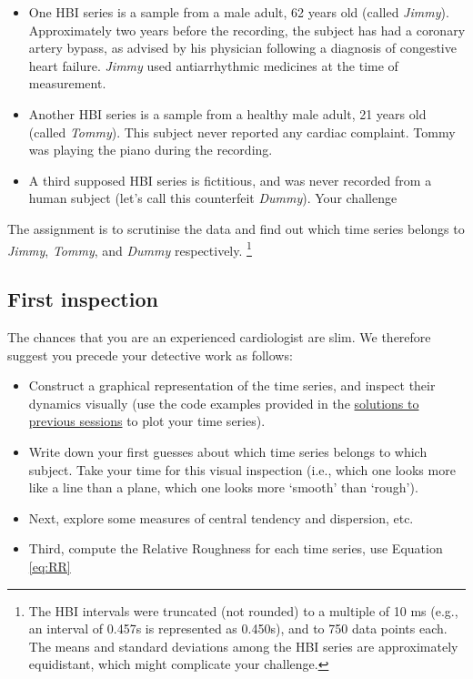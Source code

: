 \documentclass[]{book}
\providecommand{\tightlist}{%
  \setlength{\itemsep}{0pt}\setlength{\parskip}{0pt}}
\let\rmarkdownfootnote\footnote%
\def\footnote{\protect\rmarkdownfootnote}
\begin{document}
\begin{itemize}
\item
  One HBI series is a sample from a male adult, 62 years old (called
  \emph{Jimmy}). Approximately two years before the recording, the
  subject has had a coronary artery bypass, as advised by his physician
  following a diagnosis of congestive heart failure. \emph{Jimmy} used
  antiarrhythmic medicines at the time of measurement.
\item
  Another HBI series is a sample from a healthy male adult, 21 years old
  (called \emph{Tommy}). This subject never reported any cardiac
  complaint. Tommy was playing the piano during the recording.
\item
  A third supposed HBI series is fictitious, and was never recorded from
  a human subject (let's call this counterfeit \emph{Dummy}). Your
  challenge
\end{itemize}

The assignment is to scrutinise the data and find out which time series
belongs to \emph{Jimmy}, \emph{Tommy}, and \emph{Dummy} respectively.
\footnote{The HBI intervals were truncated (not rounded) to a multiple
  of 10 ms (e.g., an interval of 0.457s is represented as 0.450s), and
  to 750 data points each. The means and standard deviations among the
  HBI series are approximately equidistant, which might complicate your
  challenge.}

\subsection{First inspection}\label{first-inspection}

The chances that you are an experienced cardiologist are slim. We
therefore suggest you precede your detective work as follows:

\begin{itemize}
\tightlist
\item
  Construct a graphical representation of the time series, and inspect
  their dynamics visually (use the code examples provided in the
  \protect\hyperlink{moc1Rsol}{solutions to previous sessions} to plot
  your time series).
\item
  Write down your first guesses about which time series belongs to which
  subject. Take your time for this visual inspection (i.e., which one
  looks more like a line than a plane, which one looks more `smooth'
  than `rough').
\item
  Next, explore some measures of central tendency and dispersion, etc.
\item
  Third, compute the Relative Roughness for each time series, use
  Equation \eqref{eq:RR}
\end{itemize}
\end{document}
